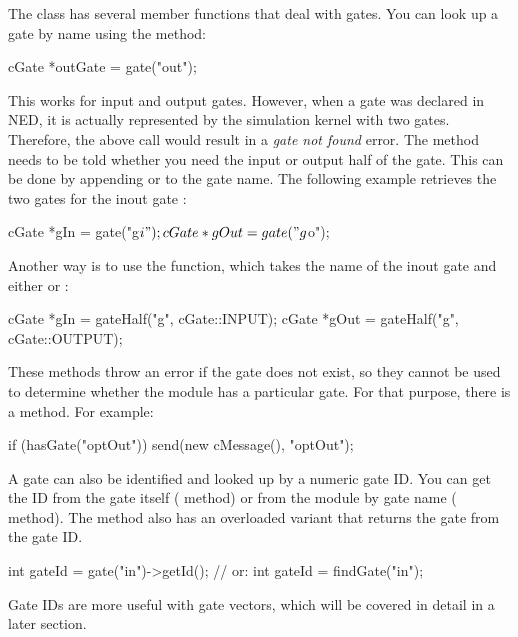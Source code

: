 The  class has several member functions that
deal with gates. You can look up a gate by name using the 
method:

\begin{cpp}
cGate *outGate = gate("out");
\end{cpp}

This works for input and output gates. However, when a gate was declared
 in NED, it is actually represented by the simulation kernel
with two gates. Therefore, the above call would result in a \textit{gate not found}
error. The  method needs to be told whether you need the input or
output half of the gate. This can be done by appending
 or  to the gate name. The following example
retrieves the two gates for the inout gate :

\begin{cpp}
cGate *gIn = gate("g$i");
cGate *gOut = gate("g$o");
\end{cpp}

Another way is to use the  function, which takes
the name of the inout gate and either  or :

\begin{cpp}
cGate *gIn = gateHalf("g", cGate::INPUT);
cGate *gOut = gateHalf("g", cGate::OUTPUT);
\end{cpp}

These methods throw an error if the gate does not exist, so they cannot
be used to determine whether the module has a particular gate.
For that purpose, there is a  method. For example:

\begin{cpp}
if (hasGate("optOut"))
   send(new cMessage(), "optOut");
\end{cpp}

A gate can also be identified and looked up by a numeric gate ID.
You can get the ID from the gate itself ( method)
or from the module by gate name ( method).
The  method also has an overloaded variant that
returns the gate from the gate ID.

\begin{cpp}
int gateId = gate("in")->getId();  // or:
int gateId = findGate("in");
\end{cpp}

Gate IDs are more useful with gate vectors, which will be covered
in detail in a later section.


